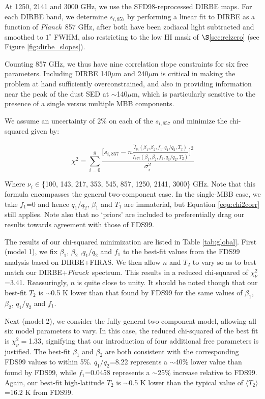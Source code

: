 \documentclass{emulateapj}
\newcommand{\PLANCK}{{\it Planck}}
\begin{document}
At 1250, 2141 and 3000 GHz, we use the SFD98-reprocessed DIRBE maps. For each
DIRBE band, we determine $s_{i, 857}$ by performing a linear fit to DIRBE as a 
function of \PLANCK~857 GHz, after both have been zodiacal light subtracted and
smoothed to $1^{\circ}$ FWHM, also restricting to the low HI mask of 
$\S$\ref{sec:relzero} (see Figure \ref{fig:dirbe_slopes}).

Counting 857 GHz, we thus have nine correlation slope constraints for six 
free parameters. Including DIRBE 140$\mu$m and 240$\mu$m is critical in making 
the problem at hand sufficiently overconstrained, and also in providing 
information near the peak of the dust SED at $\sim$140$\mu$m, which is 
particularly sensitive to the presence of a single versus multiple MBB 
components. 

We assume an uncertainty of 2\% on each of the $s_{i, 857}$ and minimize the 
chi-squared given by:

\begin{equation} \label{equ:chi2corr}
\chi^2 = \sum_{i=0}^{8}\frac{\big[s_{i, 857}-n\frac{\tilde{I}_{\nu_i}(\beta_1, \beta_2, f_1, q_1/q_2, T_2)}{\tilde{I}_{857}(\beta_1, \beta_2, f_1, q_1/q_2, T_2)}\big]^2}{\sigma_{i}^2}
\end{equation}

Where $\nu_i$$\in$\{100, 143, 217, 353, 545, 857, 1250, 2141, 3000\} GHz. Note 
that this formula encompasses the general two-component case. In the single-MBB
case, we take $f_1$=0 and hence $q_1/q_2$, $\beta_1$ and $T_1$ are immaterial, 
but Equation \ref{equ:chi2corr} still applies. Note also that no `priors' are
included to preferentially drag our results towards agreement with those of 
FDS99.

The results of our chi-squared minimization are listed in Table 
\ref{tab:global}. First (model 1), we fix $\beta_1$, $\beta_2$ ,$q_1/q_2$ and
$f_1$ to the best-fit values from the FDS99 analysis based on DIRBE+FIRAS. We
then allow $n$ and $T_2$ to vary so as to best match our 
DIRBE+\PLANCK~spectrum. This results in a reduced chi-squared of 
$\chi^2_{\nu}$=3.41. Reassuringly, $n$ is quite close to unity. It should be 
noted though that our best-fit $T_2$ is $\sim$0.5 K lower than that found by 
FDS99 for the same values of $\beta_1$, $\beta_2$, $q_1/q_2$ and $f_1$.

Next (model 2), we consider the fully-general two-component model, allowing all
 six model parameters to vary. In this case, the reduced chi-squared of the 
best fit is $\chi^2_{\nu}=$1.33, signifying that our introduction of four 
additional free parameters is justified. The best-fit $\beta_1$ and $\beta_2$ 
are both consistent with the corresponding FDS99 values to within 5\%. 
$q_1/q_2$=8.22 represents a $\sim$40\% lower value than found by FDS99, while
$f_1$=0.0458 represents a $\sim$25\% increase relative to FDS99. Again, our
best-fit high-latitude $T_2$ is $\sim$0.5 K lower than the typical value of 
$\langle T_2 \rangle$=16.2 K from FDS99.
\end{document}
